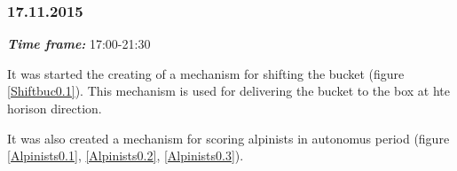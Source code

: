 \subsubsection{17.11.2015}
\textit{\textbf{Time frame:}} 17:00-21:30

It was started the creating of a mechanism for shifting the bucket (figure \ref{Shiftbuc0.1}). This mechanism is used for delivering the bucket to the box at hte horison direction.

It was also created a mechanism for scoring alpinists in autonomus period (figure \ref{Alpinists0.1}, \ref{Alpinists0.2}, \ref{Alpinists0.3}).

\begin{figure}[H]
	\begin{minipage}[h]{0.31\linewidth}

\end{minipage}
\end{figure}
